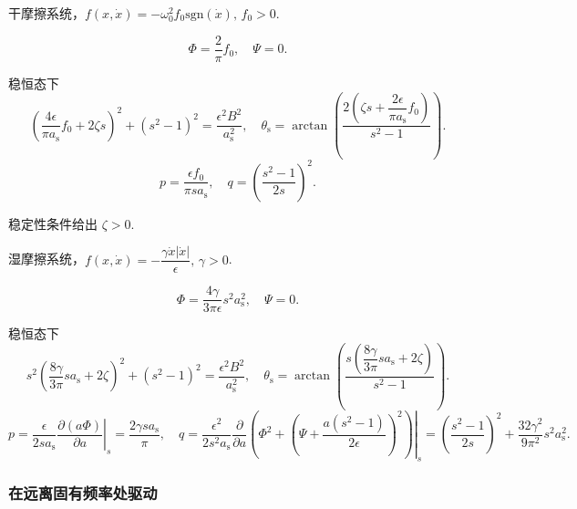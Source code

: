 \begin{example}
	干摩擦系统，\(f(x, \dot{x}) = -\omega_0^2 f_0 \text{sgn}(\dot{x}),\,f_0 > 0\).

	\begin{equation*}
		\Phi = \dfrac{2}{\pi} f_0, \quad \Psi = 0.
	\end{equation*}

	稳恒态下
	\begin{equation*}
		\left( \dfrac{4 \epsilon}{\pi a_{\mathrm{s}}} f_0 + 2 \zeta s \right)^2 + (s^2 - 1)^2 = \dfrac{\epsilon^2 B^2}{a_{\mathrm{s}}^2}, \quad \theta_{\mathrm{s}} = \arctan\left( \dfrac{2 \left( \zeta s + \dfrac{2 \epsilon}{\pi a_{\mathrm{s}}} f_0 \right)}{s^2 - 1} \right).
	\end{equation*}
	\begin{equation*}
		p = \dfrac{\epsilon f_0}{\pi s a_{\mathrm{s}}}, \quad q = \left( \dfrac{s^2 - 1}{2 s} \right)^2.
	\end{equation*}

	稳定性条件给出 \(\zeta > 0\).
\end{example}

\begin{example}
	湿摩擦系统，\(f(x, \dot{x}) = -\dfrac{\gamma \dot{x} |\dot{x}|}{\epsilon},\,\gamma > 0\).

	\begin{equation*}
		\Phi = \dfrac{4 \gamma}{3 \pi \epsilon} s^2 a_{\mathrm{s}}^2, \quad \Psi = 0.
	\end{equation*}

	稳恒态下
	\begin{equation*}
		s^2 \left( \dfrac{8 \gamma}{3 \pi} s a_{\mathrm{s}} + 2 \zeta \right)^2 + (s^2 - 1)^2 = \dfrac{\epsilon^2 B^2}{a_{\mathrm{s}}^2}, \quad \theta_{\mathrm{s}} = \arctan\left( \dfrac{s \left( \dfrac{8 \gamma}{3 \pi} s a_{\mathrm{s}} + 2 \zeta \right)}{s^2 - 1} \right).
	\end{equation*}
	\begin{equation*}
		p = \left. \dfrac{\epsilon}{2 s a_{\mathrm{s}}} \dfrac{\partial (a \Phi)}{\partial a} \right|_s = \dfrac{2 \gamma s a_{\mathrm{s}}}{\pi},\quad
		q = \dfrac{\epsilon^2}{2 s^2 a_{\mathrm{s}}} \left. \dfrac{\partial}{\partial a} \left( \Phi^2 + \left( \Psi + \dfrac{a (s^2 - 1)}{2 \epsilon} \right)^2 \right) \right|_s = \left( \dfrac{s^2 - 1}{2 s} \right)^2 + \dfrac{32 \gamma^2}{9 \pi^2} s^2 a_{\mathrm{s}}^2.
	\end{equation*}
\end{example}

\subsubsection{在远离固有频率处驱动}

